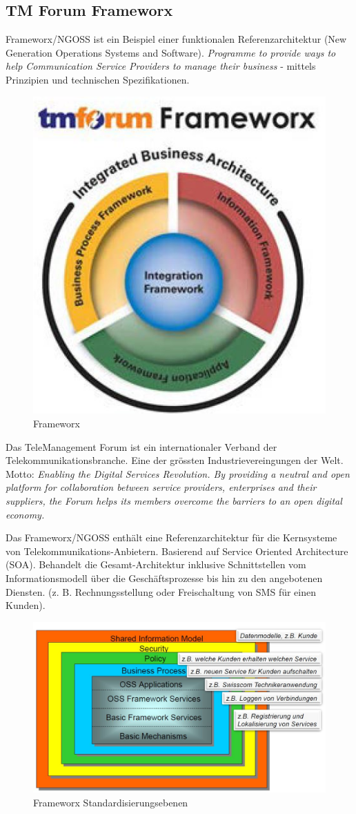 \subsection{TM Forum Frameworx}

Frameworx/NGOSS ist ein Beispiel einer funktionalen Referenzarchitektur (New Generation Operations Systems and Software). \textit{Programme to provide ways to help Communication Service Providers to manage their business} - mittels Prinzipien und technischen Spezifikationen.

\begin{figure}[h!]
\centering
\includegraphics[width=0.7\linewidth]{fig/frameworx}
\caption{Frameworx}
\label{fig:frameworx}
\end{figure}

Das TeleManagement Forum ist ein internationaler Verband der Telekommunikationsbranche. Eine der grössten Industrievereingungen der Welt. Motto: \textit{Enabling the Digital Services Revolution. By providing a neutral and open platform for collaboration between service providers, enterprises and their suppliers, the Forum helps its members overcome the barriers to an open digital economy.}

Das Frameworx/NGOSS enthält eine Referenzarchitektur für die Kernsysteme von Telekommunikations-Anbietern. Basierend auf Service Oriented Architecture (SOA). Behandelt die Gesamt-Architektur inklusive Schnittstellen vom Informationsmodell über die Geschäftsprozesse bis hin zu den angebotenen Diensten. (z. B. Rechnungsstellung oder Freischaltung von SMS für einen Kunden).

\begin{figure}[h!]
\centering
\includegraphics[width=0.7\linewidth]{fig/frameworx-standardisierungsebenen}
\caption{Frameworx Standardisierungsebenen}
\label{fig:frameworx-standardisierungsebenen}
\end{figure}


